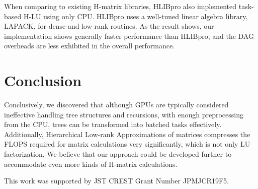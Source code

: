 \documentclass[sigconf]{acmart}
\begin{document}
When comparing to existing H-matrix libraries, HLIBpro\cite{Kriemann13} also implemented task-based H-LU using only CPU. HLIBpro uses a well-tuned linear algebra library, LAPACK, for dense and low-rank routines. As the result shows, our implementation shows generally faster performance than HLIBpro, and the DAG overheads are less exhibited in the overall performance.

\section{Conclusion}
Conclusively, we discovered that although GPUs are typically considered ineffective handling tree structures and recursions, with enough preprocessing from the CPU, trees can be transformed into batched tasks effectively. Additionally, Hierarchical Low-rank Approximations of matrices compresses the FLOPS required for matrix calculations very significantly, which is not only LU factorization. We believe that our approach could be developed further to accommodate even more kinds of H-matrix calculations.

\begin{acks}
This work was supported by JST CREST Grant Number JPMJCR19F5.
\end{acks}



\end{document}
